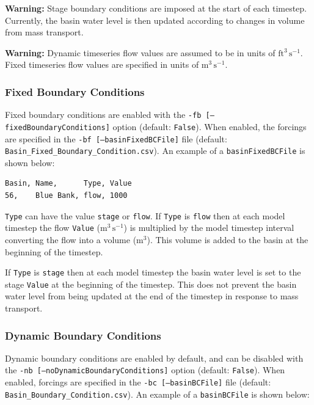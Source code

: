 {\bf Warning:} Stage boundary conditions are imposed at the start of each timestep. Currently, the basin water level is then updated according to changes in volume from mass transport. 

{\bf Warning:} Dynamic timeseries flow values are assumed to be in units of $\mathrm{ft^3\,s^{-1}}$.  Fixed timeseries flow values are specified in units of $\mathrm{m^3\,s^{-1}}$.

\subsubsection{Fixed Boundary Conditions}
\label{sec:Fixed Boundary Conditions}
Fixed boundary conditions are enabled with the \texttt{-fb [--fixedBoundaryConditions]} option (default: \texttt{False}).  When enabled, the forcings are specified in the \texttt{-bf [--basinFixedBCFile]} file (default: \texttt{Basin\_Fixed\_Boundary\_Condition.csv}).  An example of a \texttt{basinFixedBCFile} is shown below:

\begin{verbatim}
Basin, Name,      Type, Value
56,    Blue Bank, flow, 1000
\end{verbatim}

\texttt{Type} can have the value \texttt{stage} or \texttt{flow}. If \texttt{Type} is \texttt{flow} then at each model timestep the flow \texttt{Value} ($\mathrm{m^3\,s^{-1}}$) is multiplied by the model timestep interval converting the flow into a volume ($\mathrm{m^3}$).  This volume is added to the basin at the beginning of the timestep. 

If \texttt{Type} is \texttt{stage} then at each model timestep the basin water level is set to the stage \texttt{Value} at the beginning of the timestep.  This does not prevent the basin water level from being updated at the end of the timestep in response to mass transport. 

\subsubsection{Dynamic Boundary Conditions}
\label{sec:Dynamic Boundary Conditions}
Dynamic boundary conditions are enabled by default, and can be disabled with the \texttt{-nb [--noDynamicBoundaryConditions]} option (default: \texttt{False}).  When enabled, forcings are specified in the \texttt{-bc [--basinBCFile]} file (default: \texttt{Basin\_Boundary\_Condition.csv}). An example of a \texttt{basinBCFile} is shown below:

